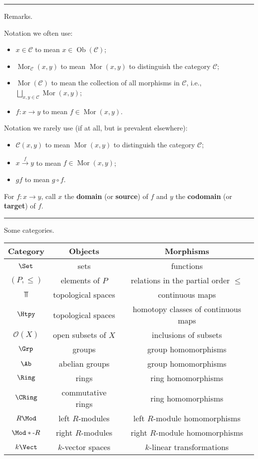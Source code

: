 \documentclass[12pt]{article}
\newcommand{\keyword}[1]{\textbf{#1}}
\newcommand{\sepline}{\rule{\textwidth}{0.4pt}}
\theoremstyle{definition}
\newcommand{\CC}{\mathcal{C}}
\newcommand{\OO}{\mathcal{O}}
\newcommand{\<}{\left\langle}
\renewcommand{\>}{\right\rangle}
\DeclareMathOperator{\Ob}{Ob}
\DeclareMathOperator{\Mor}{Mor}
\begin{document}
\sepline

Remarks.

Notation we often use:
\begin{itemize}
    \item $x \in \CC$ to mean $x \in \Ob(\CC)$;
    \item $\Mor_\CC(x, y)$ to mean $\Mor(x, y)$ to distinguish the category $\CC$;
    \item $\Mor(\CC)$ to mean the collection of all morphisms in $\CC$, i.e., $\bigsqcup_{x, y \in \CC} \Mor(x, y)$;
    \item $f : x \to y$ to mean $f \in \Mor(x, y)$.
\end{itemize}

Notation we rarely use (if at all, but is prevalent elsewhere):
\begin{itemize}
    \item $\CC(x, y)$ to mean $\Mor(x, y)$ to distinguish the category $\CC$;
    \item  $x \xrightarrow{f} y$ to mean $f \in \Mor(x, y)$;
    \item $gf$ to mean $g \circ f$.
\end{itemize}

For $f : x \to y$, call $x$ the \keyword{domain} (or \keyword{source}) of $f$ and $y$ the \keyword{codomain} (or \keyword{target}) of $f$.


\sepline

Some categories.
\begin{center}
    \begin{tabular}{c|c|c}
        Category & Objects & Morphisms \\
        \hline
        $\Set$ & sets & functions \\
        $(P, \leq)$ & elements of $P$ & relations in the partial order $\leq$ \\
        $\Top$ & topological spaces & continuous maps \\
        $\Htpy$ & topological spaces & homotopy classes of continuous maps \\
        $\OO(X)$ & open subsets of $X$ & inclusions of subsets \\
        $\Grp$ & groups & group homomorphisms \\
        $\Ab$ & abelian groups & group homomorphisms \\
        $\Ring$ & rings & ring homomorphisms \\
        $\CRing$ & commutative rings & ring homomorphisms \\
        $R\Mod$ & left $R$-modules & left $R$-module homomorphisms \\
        $\Mod*\text{-}R$ & right $R$-modules & right $R$-module homomorphisms \\
        $k\Vect$ & $k$-vector spaces & $k$-linear transformations
    \end{tabular}
\end{center}
\end{document}
